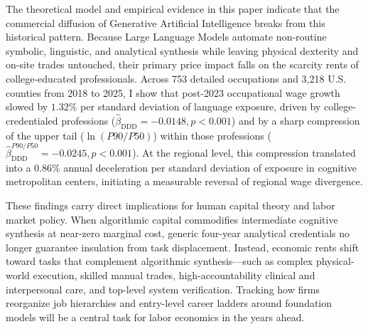 \documentclass[12pt]{article}
\begin{document}
The theoretical model and empirical evidence in this paper indicate that the commercial diffusion of Generative Artificial Intelligence breaks from this historical pattern. Because Large Language Models automate non-routine symbolic, linguistic, and analytical synthesis while leaving physical dexterity and on-site trades untouched, their primary price impact falls on the scarcity rents of college-educated professionals. Across 753 detailed occupations and 3,218 U.S. counties from 2018 to 2025, I show that post-2023 occupational wage growth slowed by $1.32\%$ per standard deviation of language exposure, driven by college-credentialed professions ($\hat{\beta}_{\text{DDD}} = -0.0148, p < 0.001$) and by a sharp compression of the upper tail ($\ln(P90/P50)$) within those professions ($\hat{\beta}_{\text{DDD}}^{P90/P50} = -0.0245, p < 0.001$). At the regional level, this compression translated into a $0.86\%$ annual deceleration per standard deviation of exposure in cognitive metropolitan centers, initiating a measurable reversal of regional wage divergence.

These findings carry direct implications for human capital theory and labor market policy. When algorithmic capital commodifies intermediate cognitive synthesis at near-zero marginal cost, generic four-year analytical credentials no longer guarantee insulation from task displacement. Instead, economic rents shift toward tasks that complement algorithmic synthesis---such as complex physical-world execution, skilled manual trades, high-accountability clinical and interpersonal care, and top-level system verification. Tracking how firms reorganize job hierarchies and entry-level career ladders around foundation models will be a central task for labor economics in the years ahead.
\end{document}
